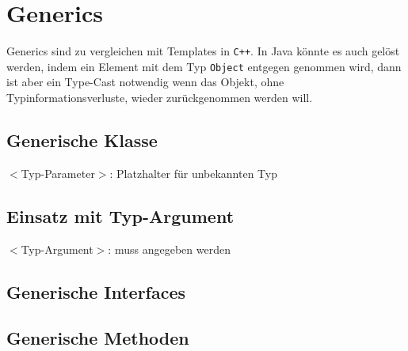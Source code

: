 \newpage
\section*{Generics}
	\vspace{-0.7cm}
	Generics sind zu vergleichen mit Templates in \texttt{C++}. In Java könnte es auch gelöst werden, indem ein Element mit dem Typ \texttt{Object} entgegen genommen wird, dann ist aber ein Type-Cast notwendig wenn das Objekt, ohne Typinformationsverluste, wieder zurückgenommen werden will.\\
	\begin{minipage}[t]{9cm}
		\subsection*{Generische Klasse}
		$<$Typ-Parameter$>$: Platzhalter für unbekannten Typ	
		
	\end{minipage}
	\hspace*{0.5cm}
	\begin{minipage}[t]{9.3cm}
		\subsection*{Einsatz mit Typ-Argument}
		$<$Typ-Argument$>$: muss angegeben werden
		
	\end{minipage}
	
	\begin{minipage}[t]{7cm}
		\subsection*{Generische Interfaces}
		
	\end{minipage}
	\hspace*{0.5cm}
	\begin{minipage}[t]{11.3cm}
		\subsection*{Generische Methoden}
		
	\end{minipage}


